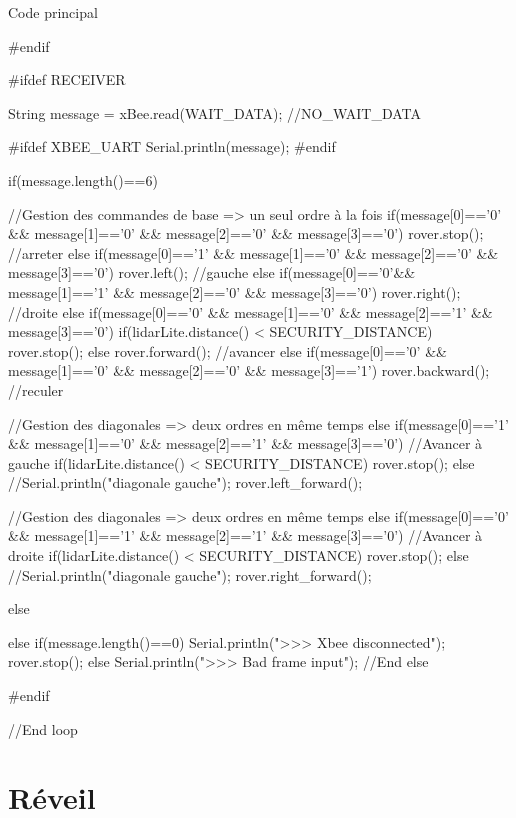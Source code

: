 {\begin{Cpp}{Code principal}
{#endif

#ifdef RECEIVER
  
	String message = xBee.read(WAIT_DATA);  //NO_WAIT_DATA

  
#ifdef XBEE_UART
	Serial.println(message);
#endif

  if(message.length()==6) 
  {
    //Gestion des commandes de base => un seul ordre à la fois    
    if(message[0]=='0' && message[1]=='0' && message[2]=='0' && message[3]=='0')
    {
      rover.stop(); //arreter
    }
    else if(message[0]=='1' && message[1]=='0' && message[2]=='0' && message[3]=='0')
    {
      rover.left(); //gauche
    }
    else if(message[0]=='0'&& message[1]=='1' && message[2]=='0' && message[3]=='0')
    {
      rover.right(); //droite
    }
    else if(message[0]=='0' && message[1]=='0' && message[2]=='1' && message[3]=='0')
    {
      if(lidarLite.distance() < SECURITY_DISTANCE)
      {
        rover.stop();
      }
      else
      {
        rover.forward(); //avancer
      }       
    }
    else if(message[0]=='0' && message[1]=='0' && message[2]=='0' && message[3]=='1')
    {
       rover.backward(); //reculer
    }

    //Gestion des diagonales => deux ordres en même temps    
    else if(message[0]=='1' && message[1]=='0' && message[2]=='1' && message[3]=='0') //Avancer à gauche
    {
    if(lidarLite.distance() < SECURITY_DISTANCE)
      {
        rover.stop();
      }
      else
      {
        //Serial.println("diagonale gauche");
       rover.left_forward();
      }             
    }

    //Gestion des diagonales => deux ordres en même temps    
    else if(message[0]=='0' && message[1]=='1' && message[2]=='1' && message[3]=='0') //Avancer à droite
    {
      if(lidarLite.distance() < SECURITY_DISTANCE)
      {
        rover.stop();
      }
      else
      {
        //Serial.println("diagonale gauche");
       rover.right_forward();
      }   
    }    

    else {}
     
  }
  else if(message.length()==0)
  {
    Serial.println(">>> Xbee disconnected");
    rover.stop();
  }
  else 
  {
    Serial.println(">>> Bad frame input");
  }//End else

  
#endif

}//End loop

\end{Cpp}\chapter{Réveil}

}
